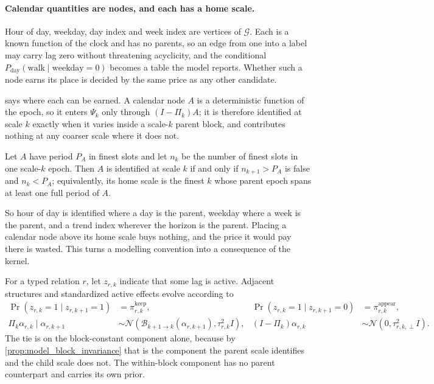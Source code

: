 \paragraph{Calendar quantities are nodes, and each has a home scale.}
\label{sec:model_calendar}

Hour of day, weekday, day index and week index are vertices of
\(\mathcal G\). Each is a known function of the clock
and has no parents, so an edge from one into a label may carry lag zero without
threatening acyclicity, and the conditional
\(P_{\mathrm{day}}(\text{walk}\mid\text{weekday}=0)\) becomes a table the model
reports. Whether such a node earns its place is decided by the same price as
any other candidate.

 says where each can be earned. A calendar
node \(A\) is a deterministic function of the epoch, so it enters \(\Psi_k\)
only through \((I-\Pi_k)A\); it is therefore identified at scale \(k\) exactly
when it varies inside a scale-\(k\) parent block, and contributes nothing at any
coarser scale where it does not.

\begin{corollary}
\label{cor:model_calendar_home}
Let \(A\) have period \(P_A\) in finest slots and let \(n_k\) be the number of
finest slots in one scale-\(k\) epoch. Then \(A\) is identified at scale \(k\)
if and only if \(n_{k+1}>P_A\) is false and \(n_k<P_A\); equivalently, its home
scale is the finest \(k\) whose parent epoch spans at least one full period of
\(A\).
\end{corollary}

So hour of day is identified where a day is the parent, weekday where a week is
the parent, and a trend index wherever the horizon is the parent. Placing a
calendar node above its home scale buys nothing, and the price it would pay
there is wasted. This turns a modelling convention into a consequence of the
kernel.

For a typed relation \(r\), let \(z_{r,k}\) indicate that some lag is active.
Adjacent structures and standardized active effects evolve according to
\begin{align}
 \Pr(z_{r,k}=1\mid z_{r,k+1}=1)&=\pi_{r,k}^{\mathrm{keep}},
 &\Pr(z_{r,k}=1\mid z_{r,k+1}=0)&=\pi_{r,k}^{\mathrm{appear}},
 \label{eq:model_scale_coupling}\\
 \Pi_k\alpha_{r,k}\mid\alpha_{r,k+1}
 &\sim\mathcal N(\mathcal B_{k+1\to k}(\alpha_{r,k+1}),\tau_{r,k}^2I),
 &(I-\Pi_k)\alpha_{r,k}
 &\sim\mathcal N(0,\tau_{r,k,\perp}^2I).
 \label{eq:model_parameter_evolution}
\end{align}
The tie is on the block-constant component alone, because by
\cref{prop:model_block_invariance} that is the component the parent scale
identifies and the child scale does not. The within-block component has no
parent counterpart and carries its own prior.

